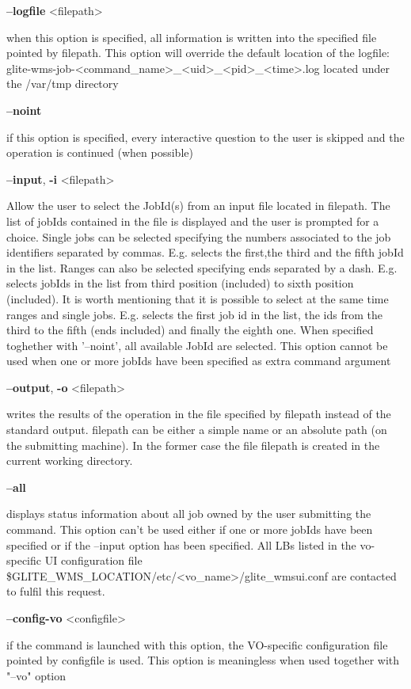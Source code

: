 {\textbf{--logfile} <filepath>

when this option is specified, all information is written into the specified file pointed by filepath.
This option will override the default location of the logfile:
glite-wms-job-<command\_name>\_<uid>\_<pid>\_<time>.log  located under the /var/tmp directory

\textbf{--noint}

if this option is specified, every interactive question to the user is skipped and the operation is continued (when possible)

\textbf{--input}, \textbf{-i} <filepath>

Allow the user to select the JobId(s) from an input file located in filepath.
The list of jobIds contained in the file is displayed and the user is prompted for a choice. Single jobs can be selected specifying the numbers associated to the job identifiers separated by commas. E.g. selects the first,the third and the fifth jobId in the list.
Ranges can also be selected specifying ends separated by a dash. E.g. selects jobIds in the list from third position (included) to sixth position (included). It is worth mentioning that it is possible to select at the same time ranges and single jobs. E.g. selects the first job id in the list, the ids from the third to the fifth (ends included) and finally the eighth one.
When specified toghether with '--noint', all available JobId are selected.
This option cannot be used when one or more jobIds have been specified as extra command argument

\textbf{--output}, \textbf{-o} <filepath>

writes the results of the operation in the file specified by filepath instead of the standard output. filepath can be either a simple name or an absolute path (on the submitting machine). In the former case the file filepath is created in the current working directory.

\textbf{--all}

displays status information about all job owned by the user submitting the command. This option can't be used
either if one or more jobIds have been specified or if the --input option has been specified. All LBs
listed in the vo-specific UI configuration file \$GLITE\_WMS\_LOCATION/etc/<vo\_name>/glite\_wmsui.conf are contacted to
fulfil this request.

\textbf{--config-vo} <configfile>

if the command is launched with this option, the VO-specific configuration file pointed by configfile is used. This option is meaningless when used together with "--vo" option

}

